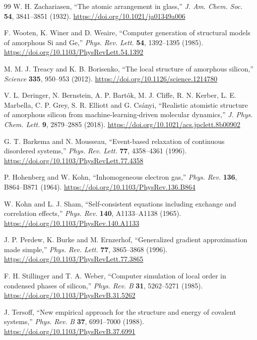 \documentclass{article}
\begin{document}
\begin{thebibliography}{99}
 W. H. Zachariasen, ``The atomic arrangement in
    glass,'' \textit{J. Am. Chem. Soc.} \textbf{54}, 3841--3851 (1932).
    \url{https://doi.org/10.1021/ja01349a006}

 F. Wooten, K. Winer and D. Weaire, ``Computer generation of
    structural models of amorphous Si and Ge,'' \textit{Phys. Rev. Lett.}
    \textbf{54}, 1392--1395 (1985).
    \url{https://doi.org/10.1103/PhysRevLett.54.1392}

 M. M. J. Treacy and K. B. Borisenko, ``The local structure
    of amorphous silicon,'' \textit{Science} \textbf{335}, 950--953 (2012).
    \url{https://doi.org/10.1126/science.1214780}

 V. L. Deringer, N. Bernstein, A. P. Bartók, M. J. Cliffe,
    R. N. Kerber, L. E. Marbella, C. P. Grey, S. R. Elliott and G. Csányi,
    ``Realistic atomistic structure of amorphous silicon from machine-learning-driven
    molecular dynamics,'' \textit{J. Phys. Chem. Lett.} \textbf{9}, 2879--2885
    (2018). \url{https://doi.org/10.1021/acs.jpclett.8b00902}

 G. T. Barkema and N. Mousseau, ``Event-based relaxation of
    continuous disordered systems,'' \textit{Phys. Rev. Lett.} \textbf{77},
    4358--4361 (1996). \url{https://doi.org/10.1103/PhysRevLett.77.4358}

 P. Hohenberg and W. Kohn, ``Inhomogeneous electron gas,''
    \textit{Phys. Rev.} \textbf{136}, B864--B871 (1964).
    \url{https://doi.org/10.1103/PhysRev.136.B864}

 W. Kohn and L. J. Sham, ``Self-consistent equations including
    exchange and correlation effects,'' \textit{Phys. Rev.} \textbf{140},
    A1133--A1138 (1965). \url{https://doi.org/10.1103/PhysRev.140.A1133}

 J. P. Perdew, K. Burke and M. Ernzerhof, ``Generalized gradient
    approximation made simple,'' \textit{Phys. Rev. Lett.} \textbf{77},
    3865--3868 (1996). \url{https://doi.org/10.1103/PhysRevLett.77.3865}

 F. H. Stillinger and T. A. Weber, ``Computer simulation of local
    order in condensed phases of silicon,'' \textit{Phys. Rev. B} \textbf{31},
    5262--5271 (1985). \url{https://doi.org/10.1103/PhysRevB.31.5262}

 J. Tersoff, ``New empirical approach for the structure and
    energy of covalent systems,'' \textit{Phys. Rev. B} \textbf{37}, 6991--7000
    (1988). \url{https://doi.org/10.1103/PhysRevB.37.6991}


\end{thebibliography}
\end{document}
